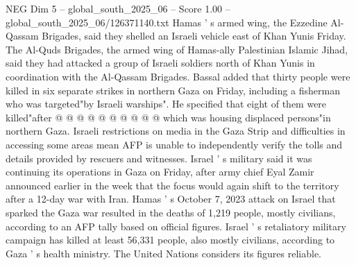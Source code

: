 \begin{textsample}{NEG Dim 5 – global\_south\_2025\_06 – Score 1.00 – global\_south\_2025\_06/126371140.txt}
Hamas ' s armed wing, the Ezzedine Al-Qassam Brigades, said they shelled an Israeli vehicle east of Khan Yunis Friday.
The Al-Quds Brigades, the armed wing of Hamas-ally Palestinian Islamic Jihad, said they had attacked a group of Israeli soldiers north of Khan Yunis in coordination with the Al-Qassam Brigades.
Bassal added that thirty people were killed in six separate strikes in northern Gaza on Friday, including a fisherman who was targeted"by Israeli warships".
He specified that eight of them were killed"after @ @ @ @ @ @ @ @ @ @ which was housing displaced persons"in northern Gaza.
Israeli restrictions on media in the Gaza Strip and difficulties in accessing some areas mean AFP is unable to independently verify the tolls and details provided by rescuers and witnesses.
Israel ' s military said it was continuing its operations in Gaza on Friday, after army chief Eyal Zamir announced earlier in the week that the focus would again shift to the territory after a 12-day war with Iran.
Hamas ' s October 7, 2023 attack on Israel that sparked the Gaza war resulted in the deaths of 1,219 people, mostly civilians, according to an AFP tally based on official figures.
Israel ' s retaliatory military campaign has killed at least 56,331 people, also mostly civilians, according to Gaza ' s health ministry.
The United Nations considers its figures reliable.

\end{textsample}
